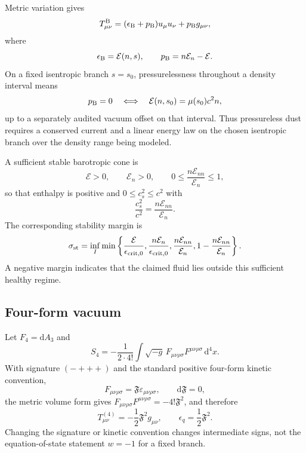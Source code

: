 \documentclass[
  aps,
  prd,
  reprint,
  superscriptaddress,
  floatfix,
  nofootinbib,
  longbibliography
]{revtex4-2}
\theoremstyle{plain}
\theoremstyle{definition}
\theoremstyle{remark}
\newcommand{\dd}{\mathrm d}
\newcommand{\crit}{\mathrm{crit}}
\newcommand{\Fcal}{\mathfrak F}
\newcommand{\Ecal}{\mathcal E}
\begin{document}
Metric variation gives
\begin{equation}
T^{\rm B}_{\mu\nu}=(\epsilon_{\rm B}+p_{\rm B})u_\mu u_\nu+p_{\rm B}g_{\mu\nu},
\end{equation}
where
\begin{equation}
\epsilon_{\rm B}=\Ecal(n,s),
\qquad
p_{\rm B}=n\Ecal_n-\Ecal.
\end{equation}
On a fixed isentropic branch $s=s_0$, pressurelessness throughout a density interval means
\begin{equation}
p_{\rm B}=0
\quad\Longleftrightarrow\quad
\Ecal(n,s_0)=\mu(s_0)c^2 n,
\label{eq:dust_law}
\end{equation}
up to a separately audited vacuum offset on that interval.  Thus pressureless dust requires a conserved current and a linear energy law on the chosen isentropic branch over the density range being modeled.

A sufficient stable barotropic cone is
\begin{equation}
\Ecal>0,
\qquad
\Ecal_n>0,
\qquad
0\le\frac{n\Ecal_{nn}}{\Ecal_n}\le1,
\label{eq:stability_cone}
\end{equation}
so that enthalpy is positive and $0\le c_s^2\le c^2$ with
\begin{equation}
\frac{c_s^2}{c^2}=\frac{n\Ecal_{nn}}{\Ecal_n}.
\end{equation}
The corresponding stability margin is
\begin{equation}
\sigma_{\rm st}=\inf_I\min\left\{\frac{\Ecal}{\epsilon_{\crit,0}},
\frac{n\Ecal_n}{\epsilon_{\crit,0}},
\frac{n\Ecal_{nn}}{\Ecal_n},
1-\frac{n\Ecal_{nn}}{\Ecal_n}\right\}.
\label{eq:stability_margin}
\end{equation}
A negative margin indicates that the claimed fluid lies outside this sufficient healthy regime.

\subsection{Four-form vacuum}

Let $F_4=\dd A_3$ and
\begin{equation}
S_4=-\frac{1}{2\cdot4!}\int\sqrt{-g}\,
F_{\mu\nu\rho\sigma}F^{\mu\nu\rho\sigma}\,\dd^4x.
\label{eq:four_action}
\end{equation}
With signature $(-+++)$ and the standard positive four-form kinetic convention,
\begin{equation}
F_{\mu\nu\rho\sigma}=\Fcal\varepsilon_{\mu\nu\rho\sigma},
\qquad
\dd\Fcal=0,
\end{equation}
the metric volume form gives $F_{\mu\nu\rho\sigma}F^{\mu\nu\rho\sigma}=-4!\Fcal^2$, and therefore
\begin{equation}
T_{\mu\nu}^{(4)}=-\frac12\Fcal^2g_{\mu\nu},
\qquad
\epsilon_q=\frac12\Fcal^2.
\end{equation}
Changing the signature or kinetic convention changes intermediate signs, not the equation-of-state statement $w=-1$ for a fixed branch.
\end{document}
